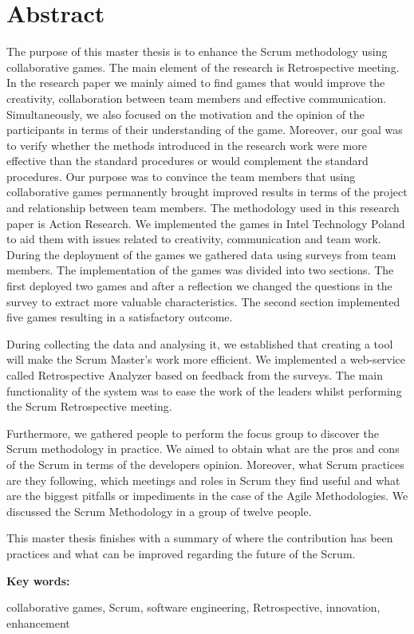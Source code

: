 \chapter*{Abstract}

\tab The purpose of this master thesis is to enhance the Scrum methodology using collaborative games. The main element of the research is Retrospective meeting. In the research paper we mainly aimed to find games that would improve the creativity, collaboration between team members and effective communication. Simultaneously, we also focused on the motivation and the opinion of the participants in terms of their understanding of the game. Moreover, our goal was to verify whether the methods introduced in the research work were more effective than the standard procedures or would complement the standard procedures. Our purpose was to convince the team members that using collaborative games permanently brought improved results in terms of the project and relationship between team members. The methodology used in this research paper is Action Research. We implemented the games in Intel Technology Poland to aid them with issues related to creativity, communication and team work. During the deployment of the games we gathered data using surveys from team members. The implementation of the games was divided into two sections. The first deployed two games and after a reflection we changed the questions in the survey to extract more valuable characteristics. The second section implemented five games resulting in a satisfactory outcome.

\tab During collecting the data and analysing it, we established that creating a tool will make the Scrum Master's work more efficient. We implemented a web-service called Retrospective Analyzer based on feedback from the surveys. The main functionality of the system was to ease the work of the leaders whilst performing the Scrum Retrospective meeting.

\tab Furthermore, we gathered people to perform the focus group to discover the Scrum methodology in practice. We aimed to obtain what are the pros and cons of the Scrum in terms of the developers opinion. Moreover, what Scrum practices are they following, which meetings and roles in Scrum they find useful and what are the biggest pitfalls or impediments in the case of the Agile Methodologies. We discussed the Scrum Methodology in a group of twelve people.

\tab This master thesis finishes with a summary of where the contribution has been practices and what can be improved regarding the future of the Scrum.

\vspace{12pt}
\noindent\textbf{Key words:}

\vspace{6pt}
\noindent collaborative games, Scrum, software engineering, Retrospective, innovation, enhancement